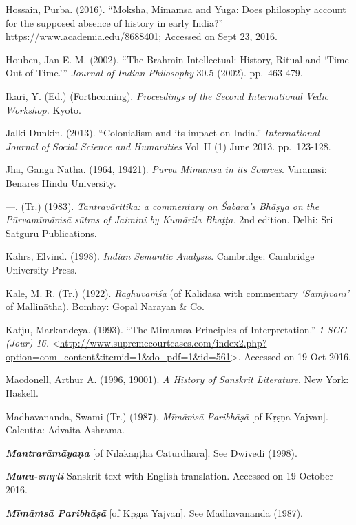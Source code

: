 \begin{thebibliography}{99}
  Hossain, Purba. (2016). “Moksha, Mimamsa and Yuga: Does philosophy account for the supposed absence of history in early India?” \url{https://www.academia.edu/8688401}; Accessed on Sept 23, 2016.

  Houben, Jan E. M. (2002). “The Brahmin Intellectual: History, Ritual and ‘Time Out of Time.’” \textit{Journal of Indian Philosophy} 30.5 (2002). pp.~463-479.

  Ikari, Y. (Ed.) (Forthcoming). \textit{Proceedings of the Second International Vedic Workshop.} Kyoto.

  Jalki Dunkin. (2013). “Colonialism and its impact on India.” \textit{International Journal of Social Science and Humanities} Vol~II (1) June 2013. pp.~123-128.

  Jha, Ganga Natha. (1964, 19421). \textit{Purva Mimamsa in its Sources}. Varanasi: Benares Hindu University.

  —. (Tr.) (1983). \textit{Tantravārttika: a commentary on Śabara's Bhāṣya on the Pūrvamīmāṁsā sūtras of Jaimini by Kumārila Bhaṭṭa.} 2nd edition. Delhi: Sri Satguru Publications.

  Kahrs, Elvind. (1998). \textit{Indian Semantic Analysis}. Cambridge: Cambridge University Press.

  Kale, M. R. (Tr.) (1922). \textit{Raghuvaṁśa} (of Kālidāsa with commentary \textit{‘Samjīvanī’} of Mallinātha). Bombay: Gopal Narayan \& Co.

  Katju, Markandeya. (1993). “The Mimamsa Principles of Interpretation.” \textit{1 SCC (Jour) 16.} \textless  \url{http://www.supremecourtcases.com/index2.php?option=com_content&itemid=1&do_pdf=1&id=561}\textgreater . Accessed on 19 Oct 2016.

  Macdonell, Arthur A. (1996, 19001). \textit{A History of Sanskrit Literature}. New York: Haskell.  

  Madhavananda, Swami (Tr.) (1987). \textit{Mīmāṁsā Paribhāṣā} [of Kṛṣṇa Yajvan]. Calcutta: Advaita Ashrama.

  \textbf{\textit{Mantrarāmāyaṇa}} [of Nīlakaṇṭha Caturdhara]. See Dwivedi (1998).

  \textbf{\textit{Manu-smṛti}} Sanskrit text with English translation. Accessed on 19 October 2016.

  \textbf{\textit{Mīmāṁsā Paribhāṣā}} [of Kṛṣṇa Yajvan]. See Madhavananda (1987).


\end{thebibliography}
